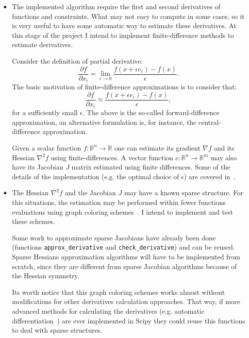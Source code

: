 \documentclass[11pt]{article}
\begin{document}
\begin{itemize}
\item
  The implemented algorithm require the first and second derivatives of functions and constraints.
  What may not easy to compute in some cases, so it is very useful to have some automatic way to
  estimate these derivatives. At this stage of the project I intend to implement finite-difference methods to
  estimate derivatives.

  Consider the definition of partial derivative:
  \begin{equation*}
    \frac{\partial f}{\partial x_i} = \lim_{\epsilon \rightarrow 0} \frac{f(x+\epsilon e_i) - f(x)}{\epsilon}.
  \end{equation*}
  The basic motivation of finite-difference approximations is to consider that:
  \begin{equation*}
    \frac{\partial f}{\partial x_i} \approx  \frac{f(x+\epsilon e_i) - f(x)}{\epsilon},
  \end{equation*}
  for a sufficiently small $\epsilon$. The above is the so-called forward-difference approximation,
  an alternative formulation is, for instance, the central-difference approximation.

  Given a scalar function $f: \mathbb{R}^n \rightarrow \mathbb{R}$ one can estimate its
  gradient $\nabla f$ and its Hessian $\nabla^2 f$ using finite-differences.
  A vector function $c: \mathbb{R}^n \rightarrow \mathbb{R}^m$ may also have its Jacobian $J$
  matrix estimated using finite differences. Some of the details of the implementation
  (e.g. the optimal choice of $\epsilon$) are covered in~\cite[Sec. 8.1]{nocedal2006numerical}.
\item
  The Hessian $\nabla^2 f$ and the Jacobian $J$ may have a known sparse structure. For this situations,
  the estimation may be performed within fewer functions evaluations using graph coloring
  schemes~\cite{coleman1983estimation, coleman1984estimation}. I intend to implement and
  test these schemes.

  Some work to approximate sparse Jacobians have already been done
  (functions \texttt{approx\_derivative} and \texttt{check\_derivative}) and can be reused.
  Sparse Hessians approximation algorithms will have to be implemented from scratch, since they are different
  from sparse Jacobian algorithms because of the Hessian symmetry.
  
  Its worth notice that this graph coloring schemes works almost
  without modifications for other derivatives calculation approaches.
  That way, if more advanced methods for calculating the derivatives
  (e.g. automatic differentiation~\cite[Sec. 8.2]{nocedal2006numerical})
  are ever implemented in Scipy they could reuse this functions to deal
  with sparse structures.
\end{itemize}
\end{document}
